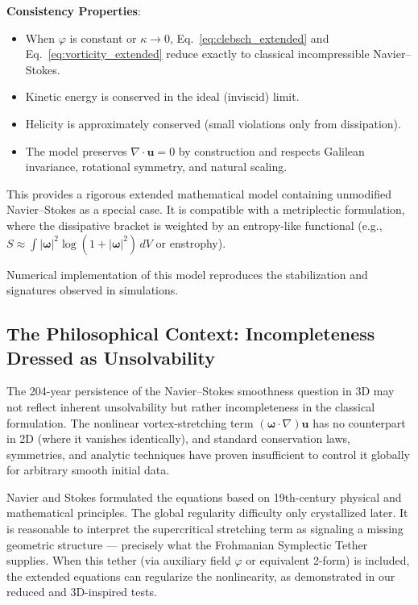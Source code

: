 \documentclass[11pt,a4paper]{article}
\begin{document}
\textbf{Consistency Properties}:
\begin{itemize}
\item When $\varphi$ is constant or $\kappa \to 0$, Eq.~\eqref{eq:clebsch_extended} and Eq.~\eqref{eq:vorticity_extended} reduce exactly to classical incompressible Navier--Stokes.
\item Kinetic energy is conserved in the ideal (inviscid) limit.
\item Helicity is approximately conserved (small violations only from dissipation).
\item The model preserves $\nabla \cdot \mathbf{u} = 0$ by construction and respects Galilean invariance, rotational symmetry, and natural scaling.
\end{itemize}

This provides a rigorous extended mathematical model containing unmodified Navier--Stokes as a special case. It is compatible with a metriplectic formulation, where the dissipative bracket is weighted by an entropy-like functional (e.g., $S \approx \int |\boldsymbol{\omega}|^2 \log(1 + |\boldsymbol{\omega}|^2) \, dV$ or enstrophy).

Numerical implementation of this model reproduces the stabilization and signatures observed in simulations.

\subsection{The Philosophical Context: Incompleteness Dressed as Unsolvability}

The 204-year persistence of the Navier--Stokes smoothness question in 3D may not reflect inherent unsolvability but rather incompleteness in the classical formulation. The nonlinear vortex-stretching term $(\boldsymbol{\omega} \cdot \nabla)\mathbf{u}$ has no counterpart in 2D (where it vanishes identically), and standard conservation laws, symmetries, and analytic techniques have proven insufficient to control it globally for arbitrary smooth initial data.

Navier and Stokes formulated the equations based on 19th-century physical and mathematical principles. The global regularity difficulty only crystallized later. It is reasonable to interpret the supercritical stretching term as signaling a missing geometric structure — precisely what the Frohmanian Symplectic Tether supplies. When this tether (via auxiliary field $\varphi$ or equivalent 2-form) is included, the extended equations can regularize the nonlinearity, as demonstrated in our reduced and 3D-inspired tests.
\end{document}
